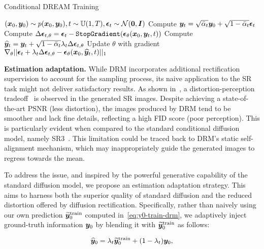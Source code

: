 \begin{algorithm}[t]
\small
\caption{Conditional DREAM Training}
\begin{algorithmic}[1]\label{alg:dr-training}
    \REPEAT
    \STATE $({\bm{x}}_0, {\bm{y}}_0)\sim p({\bm{x}}_0, {\bm{y}}_0), t\sim{\mathbb{U}}(1,T), \bm{{\mathbf{\epsilon}}}_t\sim{\mathcal{N}}({\bm{0}}, {\bm{I}})$
    \STATE Compute ${\bm{y}}_t = \sqrt{\bar{\alpha}_t}{\bm{y}}_0 + \sqrt{1-\bar{\alpha}_t}\bm{{\mathbf{\epsilon}}}_t$
    \STATE Compute $\Delta\bm{{\mathbf{\epsilon}}}_{t,\theta}=\bm{{\mathbf{\epsilon}}}_t-\texttt{StopGradient}(\bm{{\mathbf{\epsilon}}}_{\mathbf{\theta}}({\bm{x}}_0, {\bm{y}}_t, t))$ \label{line:start}
    \STATE
    Compute $\widehat{{\bm{y}}}_t={\bm{y}}_t+ \sqrt{1-\bar{\alpha}_t}\lambda_t\Delta\bm{{\mathbf{\epsilon}}}_{t,\theta}$
    \STATE Update $\theta$ with gradient  $\nabla_{\mathbf{\theta}}||\bm{{\mathbf{\epsilon}}}_t +\lambda_t\Delta\bm{{\mathbf{\epsilon}}}_{t,\theta}-\bm{{\mathbf{\epsilon}}}_{\mathbf{\theta}}({\bm{x}}_0,\widehat{{\bm{y}}}_t, t)||_1$\label{line:end}
\end{algorithmic}
\end{algorithm}

\textbf{Estimation adaptation.} While DRM incorporates additional rectification supervision to account for the sampling process, its naive application to the SR task might not deliver satisfactory results. As shown in~, a distortion-perception tradeoff~\cite{blau2018perception} is observed in the generated SR images.  Despite achieving a state-of-the-art PSNR (less distortion), the images produced by DRM tend to be smoother and lack fine details, reflecting a high FID score (poor perception). This is particularly evident when compared to the standard conditional diffusion model, namely SR3~\cite{saharia2022image}.  This limitation could be traced back to DRM's static self-alignment mechanism, which may inappropriately guide the generated images to regress towards the mean.

To address the issue, and inspired by the powerful generative capability of the standard diffusion model, we propose an estimation adaptation strategy. This aims to harness both the superior quality of standard diffusion and the reduced distortion offered by diffusion rectification. Specifically, rather than naively using our own prediction $\widetilde{{\bm{y}}}_0^\text{train}$ computed in~\cref{eq:y0-train-drm}, we adaptively inject ground-truth information ${\bm{y}}_0$ by blending it with $\widetilde{{\bm{y}}}_0^\text{train}$ as follows: 

\vspace{-.23in}
\begin{align}\label{eq:blend-hat-y0}
\small
    \widehat{{\bm{y}}}_0 = \lambda_t \widetilde{{\bm{y}}}_0^{\text{train}} + (1-\lambda_t) {\bm{y}}_0,
\end{align}
\vspace{-.22in}

